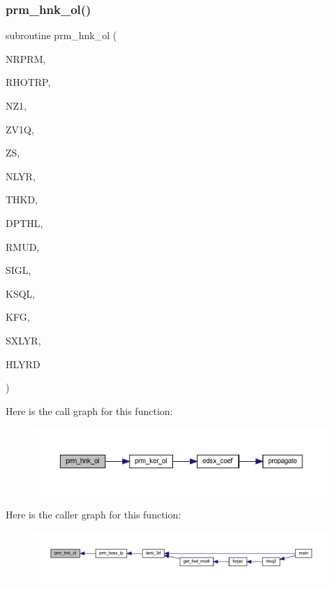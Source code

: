 \subsubsection{\texorpdfstring{prm\+\_\+hnk\+\_\+ol()}{prm\_hnk\_ol()}}
{\footnotesize\ttfamily subroutine prm\+\_\+hnk\+\_\+ol (\begin{DoxyParamCaption}\item[{integer}]{N\+R\+P\+RM,  }\item[{real, dimension(nrprm)}]{R\+H\+O\+T\+RP,  }\item[{integer}]{N\+Z1,  }\item[{real(kind=ql), dimension(nz1)}]{Z\+V1Q,  }\item[{real(kind=ql)}]{ZS,  }\item[{integer}]{N\+L\+YR,  }\item[{real(kind=ql), dimension (nlyr)}]{T\+H\+KD,  }\item[{real(kind=ql), dimension (nlyr)}]{D\+P\+T\+HL,  }\item[{real(kind=ql), dimension(0\+:nlyr)}]{R\+M\+UD,  }\item[{complex(kind=ql), dimension (nlyr)}]{S\+I\+GL,  }\item[{complex(kind=ql), dimension (nlyr)}]{K\+S\+QL,  }\item[{integer}]{K\+FG,  }\item[{integer}]{S\+X\+L\+YR,  }\item[{complex(kind=ql), dimension(nrprm,3,nz1)}]{H\+L\+Y\+RD }\end{DoxyParamCaption})}

Here is the call graph for this function\+:\nopagebreak
\begin{figure}[H]
\begin{center}
\leavevmode
\includegraphics[width=350pt]{Leroi_8f90_a89b4321e05fd2190aba745c6eec86645_cgraph}
\end{center}
\end{figure}
Here is the caller graph for this function\+:\nopagebreak
\begin{figure}[H]
\begin{center}
\leavevmode
\includegraphics[width=350pt]{Leroi_8f90_a89b4321e05fd2190aba745c6eec86645_icgraph}
\end{center}
\end{figure}
\mbox{\label{Leroi_8f90_a2ff2214d55840301662aae090b26e04d}} 
